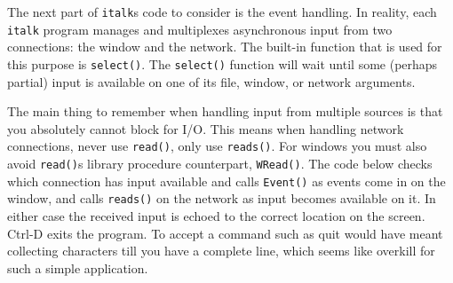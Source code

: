 The next part of \texttt{italk}{\textquotesingle}s code to consider is
the event handling. In reality, each \texttt{italk} program manages and
multiplexes asynchronous input from two connections: the window and the
network. The built-in function that is used for this purpose is
\texttt{select()}. The \texttt{select()} function will wait until some
(perhaps partial) input is available on one of its file, window, or
network arguments.

The main thing to remember when handling input from multiple
sources is that you absolutely cannot block for I/O. This means when
handling network connections, never use \texttt{read()},
only use \texttt{reads()}. For windows you must also avoid
\texttt{read()}{\textquotesingle}s library procedure counterpart,
\texttt{WRead()}. The code below checks which connection has input
available and calls \texttt{Event()} as events come in on the window,
and calls \texttt{reads()} on the network as input becomes available on
it. In either case the received input is echoed to the correct location
on the screen. Ctrl-D exits the program. To accept a command such as
{\textquotedbl}quit{\textquotedbl} would have meant collecting
characters till you have a complete line, which seems like overkill for
such a simple application.



